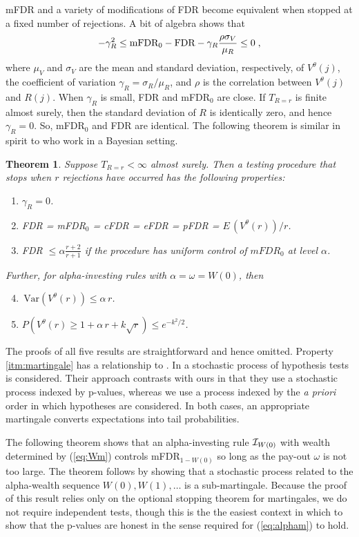 \documentclass[12pt]{article}
\newtheorem{theorem}{Theorem}
\newcommand{\Var}{\,\mbox{Var}}
\newcommand{\eqn}[1]{(\ref{#1})}
\begin{document}
mFDR and a variety of modifications of FDR become equivalent 
when stopped at a fixed number of rejections. A bit of algebra shows that
\begin{equation}
-\gamma_R^2 \le \hbox{mFDR}_0 -  \hbox{FDR} -  \gamma_R \frac{\rho \sigma_V}{\mu_R} \le 0
\;,
\label{eq:bounds}
\end{equation}
where $\mu_V$ and $\sigma_V$ are the mean and standard deviation, respectively, of $V^\theta(j)$, the coefficient of variation $\gamma_R = \sigma_R/\mu_R$, and $\rho$ is the correlation
 between $V^\theta(j)$ and $R(j)$.  When $\gamma_R$ is small, FDR and mFDR${}_0$ are close.
If $T_{R=r}$ is finite almost surely, then the standard deviation of
$R$ is identically zero, and hence $\gamma_R = 0$.  So, mFDR${}_0$ and FDR
are identical. The following theorem is similar in spirit to \cite{thc03} who work in a Bayesian setting.
\begin{theorem}\label{thm:all:same}
Suppose $T_{R=r} < \infty$ almost surely.  Then a testing procedure that
 stops when $r$ rejections have occurred has the following properties:
\begin{enumerate}
\item $\gamma_R = 0$.
\item FDR = mFDR${}_0$ = cFDR = eFDR = pFDR = $E\,(V^\theta(r))/r$.
\item FDR $ \le \alpha \frac{r + 2}{r + 1}$ if the procedure has
uniform control of $mFDR_{0}$ at level $\alpha$.
\end{enumerate}
Further, for alpha-investing rules with $\alpha = \omega = W(0) $, then
\begin{enumerate}\setcounter{enumi}{3}
\item $\Var(V^\theta(r)) \le \alpha \, r$.
\item \label{itm:martingale} $P(V^\theta(r) \ge 1 + \alpha \, r + k\sqrt{r}) \le e^{-k^2/2}$.
\end{enumerate}
\end{theorem}
\noindent
The proofs of all five results are straightforward and hence omitted. Property \ref{itm:martingale} has a relationship to \citet{wasserman02, wasserman04}.  In \citet{wasserman04} a stochastic process of
 hypothesis tests is considered.  Their approach contrasts with ours
 in that they use a stochastic process indexed by p-values, whereas we
 use a process indexed by the {\it a priori} order in which hypotheses are 
 considered.  In both cases, an appropriate martingale
 converts expectations into tail probabilities.


The following theorem shows that an alpha-investing rule ${\cal
 I}_{W(0)}$ with wealth determined by \eqn{eq:Wm} controls
 mFDR${}_{1-W(0)}$ so long as the pay-out $\omega$ is not too large.
  The theorem follows by showing that a stochastic process related to
 the alpha-wealth sequence $W(0), W(1), \ldots$ is a sub-martingale.
  Because the proof of this result relies only on the optional
 stopping theorem for martingales, we do not require independent
 tests, though this is the the easiest context in which to
 show that the p-values are honest in the sense required for
 \eqn{eq:alpham} to hold.
\end{document}
